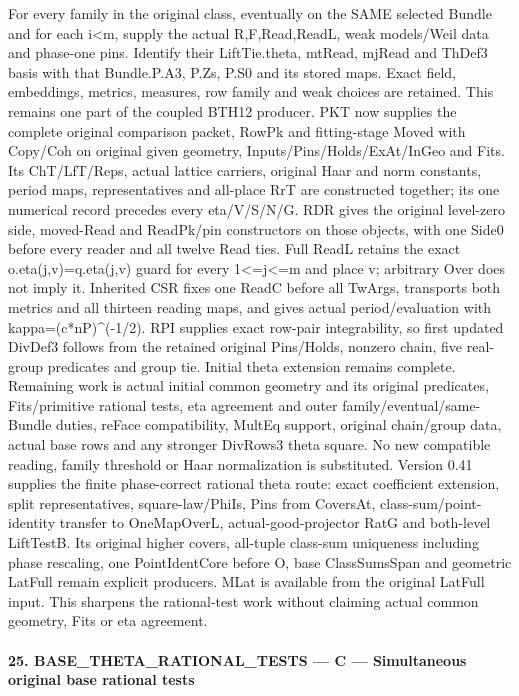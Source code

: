 \documentclass[11pt,a4paper]{article}
\numberwithin{equation}{section}
\theoremstyle{remark}\newtheorem{remark}[theorem]{Remark}
\begin{document}
For every family in the original class, eventually on the SAME selected Bundle and for each i<m, supply the actual R,F,Read,ReadL, weak models/Weil data and phase-one pins. Identify their LiftTie.theta, mtRead, mjRead and ThDef3 basis with that Bundle.P.A3, P.Zs, P.S0 and its stored maps. Exact field, embeddings, metrics, measures, row family and weak choices are retained. This remains one part of the coupled BTH12 producer. PKT now supplies the complete original comparison packet, RowPk and fitting-stage Moved with Copy/Coh on original given geometry, Inputs/Pins/Holds/ExAt/InGeo and Fits. Its ChT/LfT/Reps, actual lattice carriers, original Haar and norm constants, period maps, representatives and all-place RrT are constructed together; its one numerical record precedes every eta/V/S/N/G. RDR gives the original level-zero side, moved-Read and ReadPk/pin constructors on those objects, with one Side0 before every reader and all twelve Read ties. Full ReadL retains the exact o.eta(j,v)=q.eta(j,v) guard for every 1<=j<=m and place v; arbitrary Over does not imply it. Inherited CSR fixes one ReadC before all TwArgs, transports both metrics and all thirteen reading maps, and gives actual period/evaluation with kappa=(c*nP)\textasciicircum{}(-1/2). RPI supplies exact row-pair integrability, so first updated DivDef3 follows from the retained original Pins/Holds, nonzero chain, five real-group predicates and group tie. Initial theta extension remains complete. Remaining work is actual initial common geometry and its original predicates, Fits/primitive rational tests, eta agreement and outer family/eventual/same-Bundle duties, reFace compatibility, MultEq support, original chain/group data, actual base rows and any stronger DivRows3 theta square. No new compatible reading, family threshold or Haar normalization is substituted. Version 0.41 supplies the finite phase-correct rational theta route: exact coefficient extension, split representatives, square-law/PhiIs, Pins from CoversAt, class-sum/point-identity transfer to OneMapOverL, actual-good-projector RatG and both-level LiftTestB. Its original higher covers, all-tuple class-sum uniqueness including phase rescaling, one PointIdentCore before O, base ClassSumsSpan and geometric LatFull remain explicit producers. MLat is available from the original LatFull input. This sharpens the rational-test work without claiming actual common geometry, Fits or eta agreement.



\paragraph{25. BASE\_\allowbreak THETA\_\allowbreak RATIONAL\_\allowbreak TESTS — C — Simultaneous original base rational tests}
\end{document}
